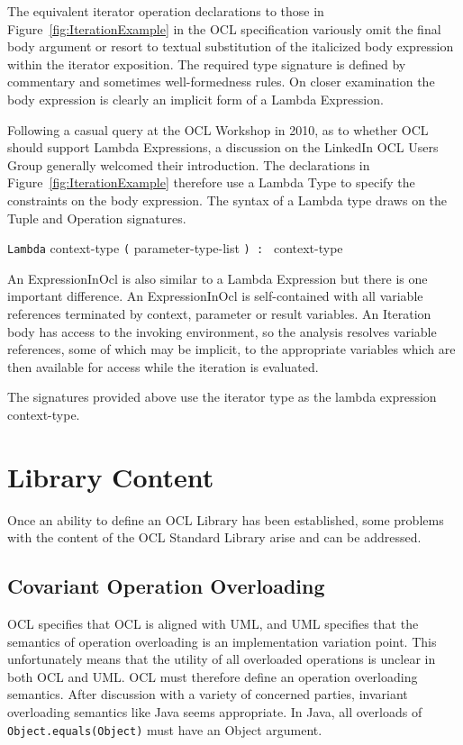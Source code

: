 \documentclass{eceasst}
\begin{document}
The equivalent iterator operation declarations to those in Figure~\ref{fig:IterationExample} in the OCL specification variously omit the final body argument or resort to textual substitution of the italicized body expression within the iterator exposition. The required type signature is defined by commentary and sometimes well-formedness rules. On closer examination the body expression is clearly an implicit form of a Lambda Expression.

Following a casual query at the OCL Workshop in 2010, as to whether OCL should support Lambda Expressions, a discussion on the LinkedIn OCL Users Group\cite{LinkedIn} generally welcomed their introduction. The declarations in Figure~\ref{fig:IterationExample} therefore use a Lambda Type to specify the constraints on the body expression. The syntax of a Lambda type draws on the Tuple and Operation signatures.

\verb|Lambda| context-type \verb|(| parameter-type-list \verb|) : | context-type

An ExpressionInOcl is also similar to a Lambda Expression but there is one important difference. An ExpressionInOcl is self-contained with all variable references terminated by context, parameter or result variables. An Iteration body has access to the invoking environment, so the analysis resolves variable references, some of which may be implicit, to the appropriate variables which are then available for access while the iteration is evaluated.

The signatures provided above use the iterator type as the lambda expression context-type.

\section{Library Content}\label{LibraryContent}

Once an ability to define an OCL Library has been established, some problems with the content of the OCL Standard Library arise and can be addressed. 

\subsection{Covariant Operation Overloading}

OCL specifies that OCL is aligned with UML, and UML specifies that the semantics of operation overloading is an implementation variation point. This unfortunately means that the utility of all overloaded operations is unclear in both OCL and UML. OCL must therefore define an operation overloading semantics. After discussion with a variety of concerned parties, invariant overloading semantics like Java seems appropriate. In Java, all overloads of \verb|Object.equals(Object)| must have an Object argument.
\end{document}
